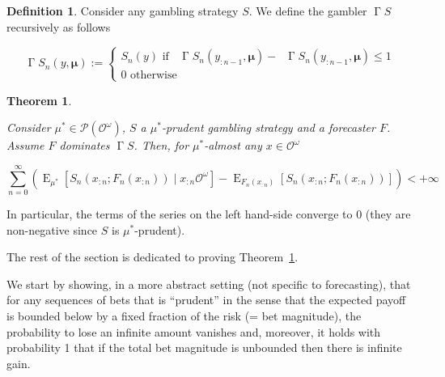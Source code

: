 \documentclass[aop,preprint]{imsart}
\numberwithin{equation}{section}
\theoremstyle{definition}
\newtheorem{definition}{Definition}[section]
\theoremstyle{plain}
\newtheorem{theorem}{Theorem}[section]
\DeclareMathOperator{\E}{E}
\newcommand{\PM}{\mathcal{P}}
\newcommand{\Ob}{\mathcal{O}}
\newcommand{\OO}{\Ob^\omega}
\newcommand{\PMO}{\PM(\OO)}
\DeclareMathOperator{\SVM}{\Sigma V_{\min}}
\DeclareMathOperator{\SVX}{\Sigma V_{\max}}
\DeclareMathOperator{\PG}{\Gamma}
\newcommand{\BM}{\bm{\mu}}
\begin{document}
\begin{definition}

Consider any gambling strategy $S$. We define the gambler $\PG{S}$ recursively as follows

\begin{equation}
\PG{S}_n\left(y,\BM\right):=\begin{cases} S_n\left(y\right) \text{ if } {\SVX{\PG{S}}_n\left(y_{:n-1},\BM\right)}-{\SVM{\PG{S}}_n\left(y_{:n-1},\BM\right)} \leq 1 \\ 0 \text{ otherwise} \end{cases}
\end{equation}

\end{definition}

\begin{theorem}
\label{thm:prudent}

Consider $\mu^* \in \PMO$, $S$ a $\mu^*$-prudent gambling strategy and a forecaster $F$. Assume $F$ dominates $\PG{S}$. Then, for $\mu^*$-almost any $x \in \OO$

\begin{equation}
\label{eqn:thm_prudent}
\sum_{n=0}^\infty \left(\E_{\mu^*}\left[S_n\left(x_{:n};F_n\left(x_{:n}\right)\right) \mid x_{:n}\OO\right]-\E_{F_n\left(x_{:n}\right)}\left[S_n\left(x_{:n};F_n\left(x_{:n}\right)\right)\right]\right) < +\infty
\end{equation}

\end{theorem}

In particular, the terms of the series on the left hand-side converge to 0 (they are non-negative since $S$ is $\mu^*$-prudent).

The rest of the section is dedicated to proving Theorem~\ref{thm:prudent}.

We start by showing, in a more abstract setting (not specific to forecasting), that for any sequences of bets that is \enquote{prudent} in the sense that the expected payoff is bounded below by a fixed fraction of the risk (= bet magnitude), the probability to lose an infinite amount vanishes and, moreover, it holds with probability 1 that if the total bet magnitude is unbounded then there is infinite gain.
\end{document}
